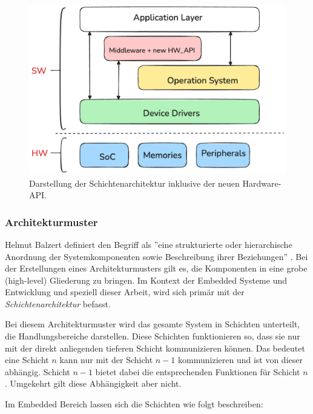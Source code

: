 \begin{figure}[H]
	\includegraphics[width=\textwidth]{Pics/layer_architecture_hw_api.png}
	\caption{Darstellung der Schichtenarchitektur inklusive der neuen Hardware-API.}
	\label{fig:layer_architecture_hw_api}
\end{figure}

\subsubsection{Architekturmuster}
Helmut Balzert definiert den Begriff als ''eine strukturierte oder hierarchische Anordnung der Systemkomponenten sowie Beschreibung ihrer Beziehungen'' \cite{balzert2011softwaretechnik2}.
Bei der Erstellungen eines Architekturmusters gilt es, die Komponenten in eine grobe (high-level) Gliederung zu bringen.
Im Kontext der Embedded Systeme und Entwicklung und speziell dieser Arbeit, wird sich primär mit der \emph{Schichtenarchitektur} befasst.

Bei diesem Architekturmuster wird das gesamte System in Schichten unterteilt, die  Handlungsbereiche darstellen.
Diese Schichten funktionieren so, dass sie nur mit der direkt anliegenden tieferen Schicht kommunizieren können.
Das bedeutet eine Schicht $n$ kann nur mit der Schicht $n-1$ kommunizieren und ist von dieser abhängig.
Schicht $n-1$ bietet dabei die entsprechenden Funktionen für Schicht $n$.
Umgekehrt gilt diese Abhängigkeit aber nicht.

Im Embedded Bereich lassen sich die Schichten wie folgt beschreiben:

